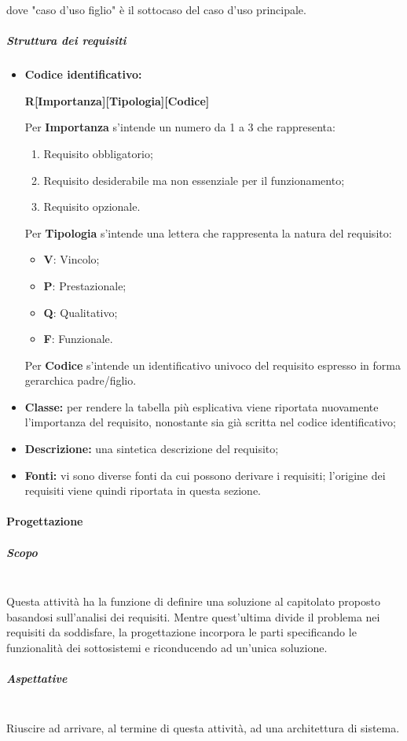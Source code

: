 dove "caso d'uso figlio" è il sottocaso del caso d'uso principale.
\subparagraph{Struttura dei requisiti} \label{para:requisiti}
\begin{itemize}
\item \textbf{Codice identificativo:} 
\begin{center}
\textbf{R[Importanza][Tipologia][Codice]}
\end{center}
 		
Per \textbf{Importanza} s'intende un numero da 1 a 3 che rappresenta:
\begin{enumerate}
\item Requisito obbligatorio;
\item Requisito desiderabile ma non essenziale per il funzionamento;
\item Requisito opzionale.
\end{enumerate}
Per \textbf{Tipologia} s'intende una lettera che rappresenta la natura del requisito:
\begin{itemize}
\item \textbf{V}: Vincolo;
\item \textbf{P}: Prestazionale;
\item \textbf{Q}: Qualitativo;
\item \textbf{F}: Funzionale.
\end{itemize}

Per \textbf{Codice} s'intende un identificativo univoco del requisito espresso in forma gerarchica padre/figlio.
\item \textbf{Classe:} per rendere la tabella più esplicativa viene riportata nuovamente l'importanza del requisito, nonostante sia già scritta nel codice identificativo;
\item \textbf{Descrizione:} una sintetica descrizione del requisito;
\item \textbf{Fonti:} vi sono diverse fonti da cui possono derivare i requisiti; l'origine dei requisiti viene quindi riportata in questa sezione. 
\end{itemize}

\paragraph{Progettazione}
\subparagraph{Scopo} \mbox{} \\
Questa attività ha la funzione di definire una soluzione al capitolato proposto basandosi sull'analisi dei requisiti.
Mentre quest'ultima divide il problema nei requisiti da soddisfare, la progettazione incorpora le parti specificando le funzionalità dei sottosistemi e riconducendo ad un'unica soluzione.
\subparagraph{Aspettative} \mbox{} \\
Riuscire ad arrivare, al termine di questa attività, ad una architettura di sistema.

